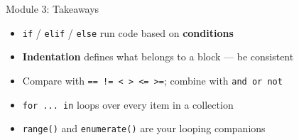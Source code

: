 \documentclass[aspectratio=169]{beamer}
\begin{document}
\begin{frame}{Module 3: Takeaways}
\vspace{0.3cm}
\begin{itemize}\setlength\itemsep{8pt}
  \item[\textcolor{wurgreen}{\faCheck}] \texttt{if} / \texttt{elif} / \texttt{else} run code based on \textbf{conditions}
  \item[\textcolor{wurgreen}{\faCheck}] \textbf{Indentation} defines what belongs to a block --- be consistent
  \item[\textcolor{wurgreen}{\faCheck}] Compare with \texttt{== != < > <= >=}; combine with \texttt{and or not}
  \item[\textcolor{wurgreen}{\faCheck}] \texttt{for ... in} loops over every item in a collection
  \item[\textcolor{wurgreen}{\faCheck}] \texttt{range()} and \texttt{enumerate()} are your looping companions
\end{itemize}
\medskip
{}
\end{frame}
\end{document}
